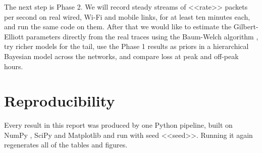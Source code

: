 \documentclass[conference]{IEEEtran}
\begin{document}
The next step is Phase 2. We will record steady streams of <<rate>> packets per second on real wired, Wi-Fi and mobile links, for at least ten minutes each, and run the same code on them. After that we would like to estimate the Gilbert-Elliott parameters directly from the real traces using the Baum-Welch algorithm \cite{baum1970}, try richer models for the tail, use the Phase 1 results as priors in a hierarchical Bayesian model across the networks, and compare loss at peak and off-peak hours.

\section*{Reproducibility}
Every result in this report was produced by one Python pipeline, built on NumPy \cite{numpy2020}, SciPy \cite{scipy2020} and Matplotlib \cite{matplotlib2007} and run with seed <<seed>>. Running it again regenerates all of the tables and figures.
\end{document}
